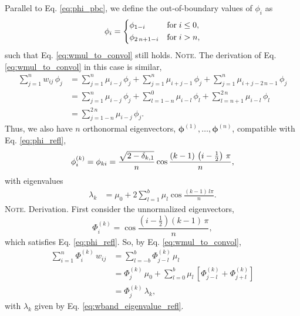 \documentclass[reprint, floatfix]{revtex4-1}
\newcommand{\note}[1]{{\color{DarkGreen}\footnotesize \textsc{Note.} #1}}
\begin{document}
Parallel to Eq. \eqref{eq:phi_pbc},
we define the out-of-boundary values
of $\phi_i$ as
%
\begin{equation}
  \phi_i
  =
  \begin{dcases}
    \phi_{ 1 - i }           & \mathrm{for \;} i \le 0, \\
    \phi_{ 2 \, n + 1 - i }  & \mathrm{for \;} i > n,
  \end{dcases}
\label{eq:phi_refl}
\end{equation}
%
such that Eq. \eqref{eq:wmul_to_convol}
still holds.
%
\note{The derivation of Eq. \eqref{eq:wmul_to_convol}
  in this case is similar,
  $$
  \begin{aligned}
    \sum_{j = 1}^n w_{ij} \, \phi_j
    &=
    \sum_{j = 1}^n
      \mu_{i - j} \, \phi_j
    +
    \sum_{j = 1}^n
      \mu_{i + j - 1} \, \phi_j
    +
    \sum_{j = 1}^n
      \mu_{i + j - 2 \, n - 1} \, \phi_j
    \\
    &=
    \sum_{j = 1}^n
      \mu_{i - j} \, \phi_j
    +
    \sum_{l = 1 - n}^0
      \mu_{i - l} \, \phi_l
    +
    \sum_{l = n + 1}^{ 2 \, n }
      \mu_{i - l} \, \phi_l
    \\
    &=
    \sum_{j = 1 - n}^{ 2 \, n}
      \mu_{i - j} \, \phi_j.
  \end{aligned}
  $$
}%
Thus, we also have $n$ orthonormal eigenvectors,
$\pmb\phi^{(1)}, \dots, \pmb\phi^{(n)}$,
compatible with Eq. \eqref{eq:phi_refl},
%
\begin{equation}
  \phi^{(k)}_i
  =
  \phi_{k i}
  =
  \frac{ \sqrt{ 2 - \delta_{k, 1} } }
       {             n              }
  \cos \frac{ ( k - 1) \, \left( i - \frac 1 2 \right) \, \pi}
            {                    n                           }
  ,
\notag
\end{equation}
%
with eigenvalues
%
\begin{align}
  \lambda_k
  &=
  \mu_0
  +
  2
  \sum_{l = 1}^b
    \mu_l
    \cos \frac{(k - 1)  \, l \pi}{n}
  .
\label{eq:wband_eigenvalue_refl}
\end{align}
%
\note{Derivation.
  First consider the unnormalized eigenvectors,
  $$
  \Phi^{(k)}_i
  =
  \cos \frac{ \left( i - \frac 1 2 \right) (k - 1) \, \pi}{n},
  $$
  which satisfies Eq. \eqref{eq:phi_refl}.
  So, by Eq. \eqref{eq:wmul_to_convol},
  $$
  \begin{aligned}
  \sum_{i = 1}^n
    \Phi^{(k)}_i \, w_{ij}
  &=
  \sum_{l = -b}^b
    \Phi^{(k)}_{j - l} \, \mu_l
  \\
  &=
    \Phi^{(k)}_j \, \mu_0
  + \sum_{l=0}^{b}
    \mu_l \,
    \left[
      \Phi^{(k)}_{j-l}
      +
      \Phi^{(k)}_{j+l}
    \right]
  \\
  &= \Phi^{(k)}_j \, \lambda_k,
  \end{aligned}
  $$
  with $\lambda_k$ given by Eq. \eqref{eq:wband_eigenvalue_refl}.
}%
\end{document}
